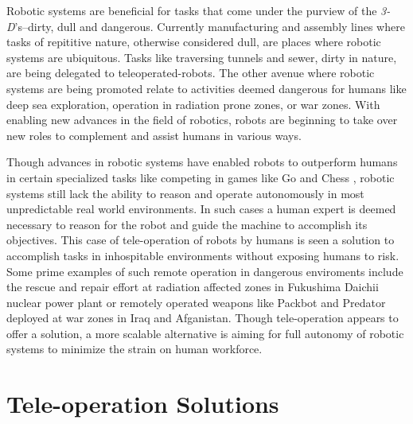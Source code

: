 \documentclass {udthesis}
\begin{document}
Robotic systems are beneficial for tasks that come under the purview of the \emph{3-D}'s--dirty, dull and dangerous. Currently manufacturing and assembly lines where tasks of repititive nature, otherwise considered dull, are places where robotic systems are ubiquitous. Tasks like traversing tunnels and sewer, dirty in nature, are being delegated to teleoperated-robots. The other avenue where robotic systems are being promoted relate to activities deemed dangerous for humans like deep sea exploration, operation in radiation prone zones, or war zones. With enabling new advances in the field of robotics, robots are beginning to take over new roles to complement and assist humans in various ways.

Though advances in robotic systems have enabled robots to outperform humans in certain specialized tasks like competing in 
games like Go \cite{deepmind} and Chess \cite{deepblue}, robotic systems still lack the ability to reason and operate
autonomously in most unpredictable real world environments. 
In such cases a human expert is deemed necessary to reason for the robot and guide the machine
to accomplish its objectives. This case of tele-operation of robots by humans is seen a solution to accomplish
tasks in inhospitable environments without exposing humans to risk. Some prime examples of such remote operation in
dangerous enviroments include the rescue and repair effort at radiation affected zones in Fukushima Daichii nuclear power plant \cite{fukushima} or remotely operated weapons like Packbot \cite{packbot} and Predator \cite{predator} deployed
at war zones in Iraq and Afganistan. Though tele-operation appears to offer a solution, a more scalable alternative
is aiming for full autonomy of robotic systems to minimize the strain on human workforce.

\section{Tele-operation Solutions}
\end{document}
